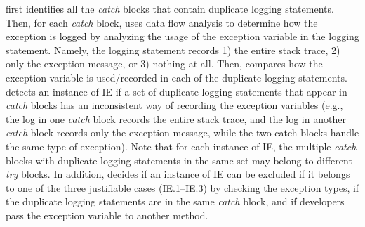 \toolS first identifies all the {\em catch} blocks that contain duplicate logging statements. Then, for each {\em catch} block, \toolS uses data flow analysis to determine how the exception is logged by analyzing the usage of the exception variable in the logging statement. Namely, the logging statement records 1) the entire stack trace, 2) only the exception message, or 3) nothing at all.
Then, \toolS compares how the exception variable is used/recorded in each of the duplicate logging statements.
\toolS detects an instance of IE if a set of duplicate logging statements that appear in {\em catch} blocks has an inconsistent way of recording the exception variables (e.g., the log in one {\em catch} block records the entire stack trace, and the log in another {\em catch} block records only the exception message, while the two catch blocks handle the same type of exception). Note that for each instance of IE, the multiple {\em catch} blocks with duplicate logging statements in the same set may belong to different {\em try} blocks. In addition, \toolS decides if an instance of IE can be excluded if it belongs to one of the three justifiable cases (IE.1--IE.3) by checking the exception types, if the duplicate logging statements are in the same {\em catch} block, and if developers pass the exception variable to another method. %

